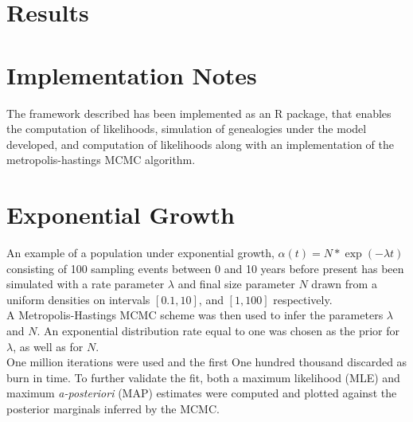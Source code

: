 \documentclass{ieeeaccess}
\theoremstyle{definition}
\begin{document}
\section{Results}
\section{Implementation Notes}
The framework described has been implemented as an R package, that enables the computation of likelihoods, simulation of genealogies under the model developed, and computation of likelihoods along with an implementation of the metropolis-hastings MCMC algorithm.
\section{Exponential Growth}
An example of a population under exponential growth, $\alpha(t) = N*\exp(-\lambda t)$ consisting of 100 sampling events between 0 and 10 years before present has been simulated with a rate parameter $\lambda$ and final size parameter $N$ drawn from a uniform densities on intervals $[0.1, 10]$, and $[1,100]$ respectively.\\
A Metropolis-Hastings MCMC scheme was then used to infer the parameters $\lambda$ and $N$. An exponential distribution rate equal to one was chosen as the prior for $\lambda$, as well as for $N$.\\
One million iterations were used and the first One hundred thousand discarded as burn in time. To further validate the fit, both a maximum likelihood (MLE) and maximum \textit{a-posteriori} (MAP) estimates were computed and plotted against the posterior marginals inferred by the MCMC.
\end{document}
